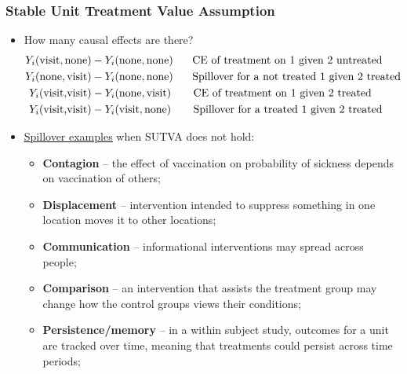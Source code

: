 \documentclass[aspectratio=169]{beamer}
\theoremstyle{principle}
\begin{document}
\begin{frame}
\frametitle{Stable Unit Treatment Value Assumption}
\begin{itemize}
\item How many causal effects are there?
\begin{align*}
Y_i(\mbox{visit},\mbox{none}) &- Y_i(\mbox{none},\mbox{none}) \hspace{5mm}\mbox{ CE of treatment on 1 given 2 untreated}\\
Y_i(\mbox{none},\mbox{visit}) &- Y_i(\mbox{none},\mbox{none}) \hspace{5mm}\mbox{ Spillover for a not treated 1 given 2 treated}\\
Y_i(\mbox{visit,visit}) &- Y_i(\mbox{none},\mbox{visit}) \hspace{6mm}\mbox{ CE of treatment on 1 given 2 treated}\\
Y_i(\mbox{visit,visit}) &- Y_i(\mbox{visit},\mbox{none}) \hspace{6mm}\mbox{ Spillover for a treated 1 given 2 treated}
\end{align*}

\item[] \color{white}\href{https://community.lawschool.cornell.edu/wp-content/uploads/2020/12/Green-presentation-on-SUTVA-for-CELS.pdf}{\underline{Spillover examples}} when SUTVA does not hold:
\begin{itemize}
\item[] \color{white} \textbf{Contagion} -- the effect of vaccination on probability of sickness depends on vaccination of others;
\item[] \color{white} \textbf{Displacement} -- intervention intended to suppress something in one location moves it to other locations;
\item[] \color{white} \textbf{Communication} -- informational interventions may spread across people;
\item[] \color{white} \textbf{Comparison} -- an intervention that assists the treatment group may change how the control groups views their conditions;
\item[] \color{white} \textbf{Persistence/memory} -- in a within subject study, outcomes for a unit are tracked over time, meaning that treatments could persist across time periods;
\end{itemize}
\end{itemize}
\end{frame}
\end{document}
